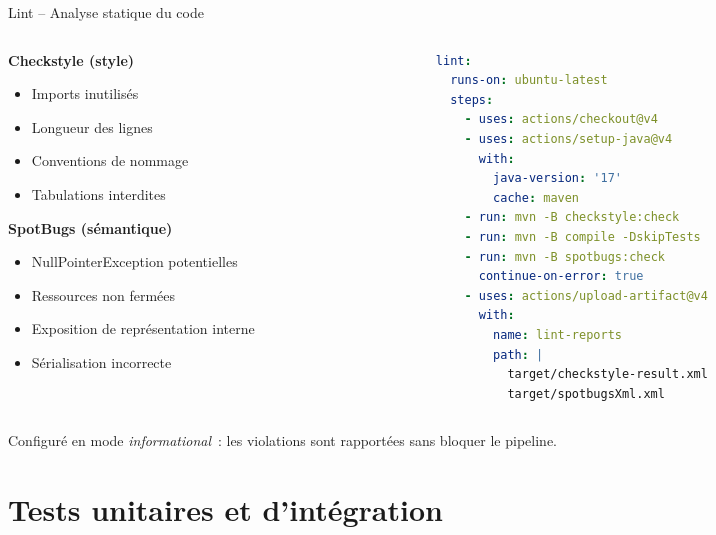 \documentclass[aspectratio=169,12pt]{beamer}
\begin{document}
\begin{frame}[fragile]{Lint -- Analyse statique du code}
  \begin{columns}
    \begin{column}{0.48\textwidth}
      \textbf{Checkstyle (style)}
      \begin{itemize}
        \item Imports inutilisés
        \item Longueur des lignes
        \item Conventions de nommage
        \item Tabulations interdites
      \end{itemize}

      \vspace{0.5em}
      \textbf{SpotBugs (sémantique)}
      \begin{itemize}
        \item NullPointerException potentielles
        \item Ressources non fermées
        \item Exposition de représentation interne
        \item Sérialisation incorrecte
      \end{itemize}
    \end{column}
    \begin{column}{0.5\textwidth}
      \begin{lstlisting}[language=YAML]
lint:
  runs-on: ubuntu-latest
  steps:
    - uses: actions/checkout@v4
    - uses: actions/setup-java@v4
      with:
        java-version: '17'
        cache: maven
    - run: mvn -B checkstyle:check
    - run: mvn -B compile -DskipTests
    - run: mvn -B spotbugs:check
      continue-on-error: true
    - uses: actions/upload-artifact@v4
      with:
        name: lint-reports
        path: |
          target/checkstyle-result.xml
          target/spotbugsXml.xml
      \end{lstlisting}
    \end{column}
  \end{columns}

  \vspace{0.3em}
  \small \alert{Configuré en mode \textit{informational}~: les violations sont rapportées sans bloquer le pipeline.}
\end{frame}

\section{Tests unitaires et d'intégration}
\end{document}
